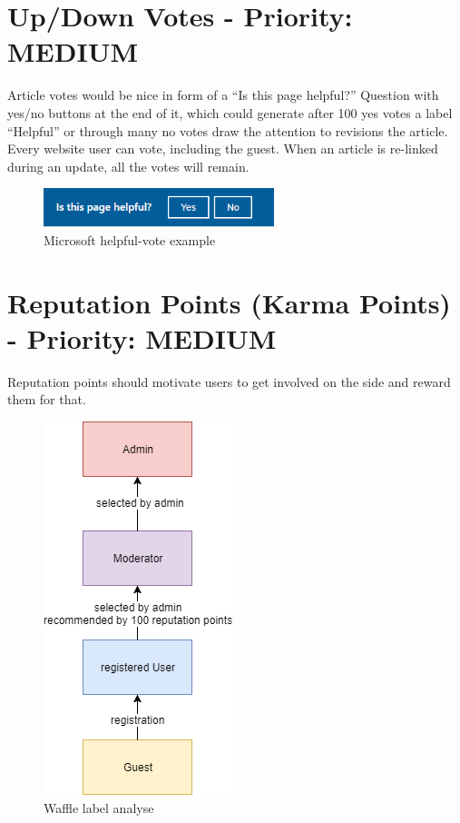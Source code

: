 \section{Up/Down Votes - Priority: MEDIUM}
\begin{tcolorbox}[breakable,colback=red!14,colframe=red!40!black,title=UPDATE 30/11/2017]
Article votes would be nice in form of a “Is this page helpful?” Question with yes/no buttons at the end of it, which could generate after 100 yes votes a label “Helpful” or through many no votes draw the attention to revisions the article.
Every website user can vote, including the guest. When an article is re-linked during an update, all the votes will remain.
\end{tcolorbox}

\begin{figure}[h] 
    \centering
    \includegraphics[width=0.6\textwidth]{Pictures/helpful_vote}
    \caption{Microsoft helpful-vote example}
\end{figure} 

\section{Reputation Points (Karma Points) - Priority: MEDIUM}
\begin{tcolorbox}[breakable,colback=red!14,colframe=red!40!black,title=UPDATE 30/11/2017]
Reputation points should motivate users to get involved on the side and reward them for that.\\
\end{tcolorbox}

\begin{figure}[h] 
    \centering
    \includegraphics[scale=0.6]{Pictures/UserStructure}
    \caption{Waffle label analyse}
\end{figure} 


